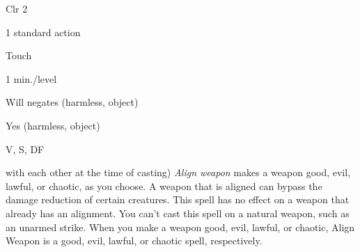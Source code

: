
\begin{description*}
\item[Level:] Clr 2
\item[Casting Time:] 1 standard action
\item[Range:] Touch
\item[Duration:] 1 min./level
\item[Saving Throw:] Will negates (harmless, object)
\item[Spell Resistance:] Yes (harmless, object)
\item[Components:] V, S, DF
\end{description*}

with each other at the time of casting)
\textit{Align weapon} makes a weapon good, evil, lawful, or chaotic, as you choose.
A weapon that is aligned can bypass the damage reduction of certain creatures.
This spell has no effect on a weapon that already has an alignment.
You can't cast this spell on a natural weapon, such as an unarmed strike.
When you make a weapon good, evil, lawful, or chaotic, Align Weapon is
a good, evil, lawful, or chaotic spell, respectively.